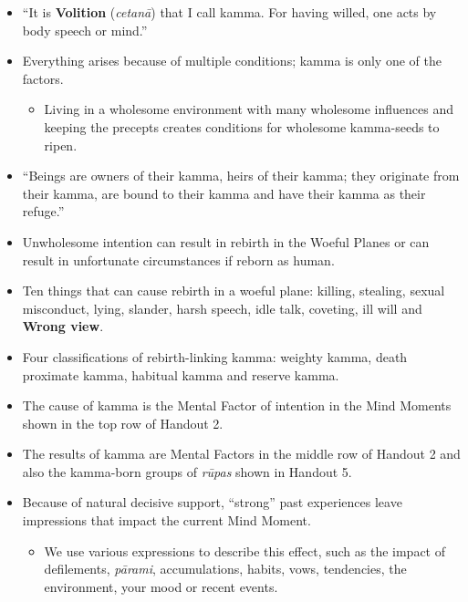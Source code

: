 \begin{itemize}

\item “It is \textbf{Volition} (\textit{cetanā}) that I call kamma. For having willed, one acts by body speech or mind.”

\item Everything arises because of multiple conditions; kamma is only one of the factors.

\begin{itemize}

\item Living in a wholesome environment with many wholesome influences and keeping the precepts creates conditions for wholesome kamma-seeds to ripen.

\end{itemize}

\item “Beings are owners of their kamma, heirs of their kamma; they originate from their kamma, are bound to their kamma and have their kamma as their refuge.”

\item Unwholesome intention can result in rebirth in the Woeful Planes or can result in unfortunate circumstances if reborn as human.

\item Ten things that can cause rebirth in a woeful plane: killing, stealing, sexual misconduct, lying, slander, harsh speech, idle talk, coveting, ill will and \textbf{Wrong view}.

\item Four classifications of rebirth-linking kamma: weighty kamma, death proximate kamma, habitual kamma and reserve kamma.

\item The cause of kamma is the Mental Factor of intention in the Mind Moments shown in the top row of Handout 2.

\item The results of kamma are Mental Factors in the middle row of Handout 2 and also the kamma-born groups of \textit{rūpas} shown in Handout 5.

\item Because of natural decisive support, “strong” past experiences leave impressions that impact the current Mind Moment.

\begin{itemize}

\item We use various expressions to describe this effect, such as the impact of defilements, \textit{pārami}, accumulations, habits, vows, tendencies, the environment, your mood or recent events.


\end{itemize}
\end{itemize}
